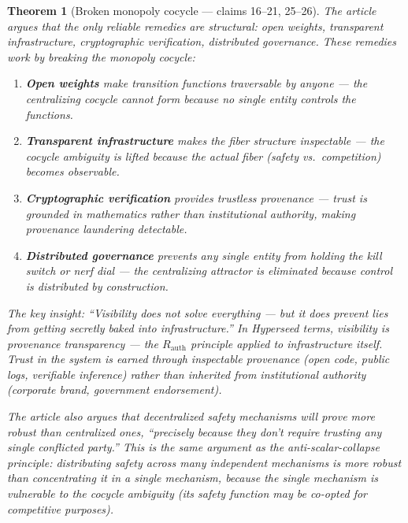 \documentclass[11pt,a4paper]{article}
\newtheorem{theorem}[definition]{Theorem}
\begin{document}
\begin{theorem}[Broken monopoly cocycle --- claims 16--21, 25--26]
\label{thm:decentral}
The article argues that the only reliable remedies are structural:
open weights, transparent infrastructure, cryptographic verification,
distributed governance. These remedies work by \emph{breaking the
monopoly cocycle}:

\begin{enumerate}
\item \textbf{Open weights} make transition functions traversable by
  anyone --- the centralizing cocycle cannot form because no single
  entity controls the functions.
\item \textbf{Transparent infrastructure} makes the fiber structure
  inspectable --- the cocycle ambiguity is lifted because the actual
  fiber (safety vs.\ competition) becomes observable.
\item \textbf{Cryptographic verification} provides trustless
  provenance --- trust is grounded in mathematics rather than
  institutional authority, making provenance laundering detectable.
\item \textbf{Distributed governance} prevents any single entity from
  holding the kill switch or nerf dial --- the centralizing attractor
  is eliminated because control is distributed by construction.
\end{enumerate}

The key insight: ``Visibility does not solve everything --- but it
does prevent lies from getting secretly baked into infrastructure.''
In Hyperseed terms, visibility is \emph{provenance transparency} ---
the $R_{\text{auth}}$ principle applied to infrastructure itself.
Trust in the system is earned through inspectable provenance (open
code, public logs, verifiable inference) rather than inherited from
institutional authority (corporate brand, government endorsement).

The article also argues that decentralized safety mechanisms will
prove \emph{more robust} than centralized ones, ``precisely because
they don't require trusting any single conflicted party.'' This is
the same argument as the anti-scalar-collapse principle: distributing
safety across many independent mechanisms is more robust than
concentrating it in a single mechanism, because the single mechanism
is vulnerable to the cocycle ambiguity (its safety function may be
co-opted for competitive purposes).
\end{theorem}

\end{document}
